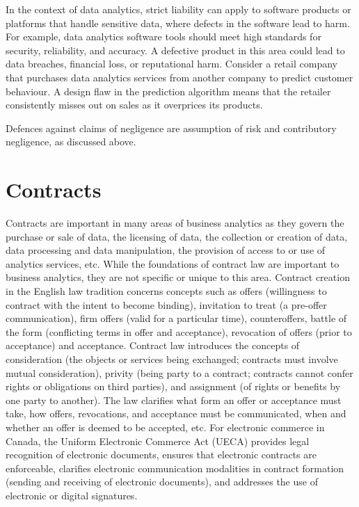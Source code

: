 In the context of data analytics, strict liability can apply to software products or platforms that handle sensitive data, where defects in the software lead to harm. For example, data analytics software tools should meet high standards for security, reliability, and accuracy. A defective product in this area could lead to data breaches, financial loss, or reputational harm. Consider a retail company that purchases data analytics services from another company to predict customer behaviour. A design flaw in the prediction algorithm means that the retailer consistently misses out on sales as it overprices its products. 

Defences against claims of negligence are assumption of risk and contributory negligence, as discussed above. 

\section{Contracts}

Contracts are important in many areas of business analytics as they govern the purchase or sale of data, the licensing of data, the collection or creation of data, data processing and data manipulation, the provision of access to or use of analytics services, etc. While the foundations of contract law are important to business analytics, they are not specific or unique to this area. Contract creation in the English law tradition concerns concepts such as offers (willingness to contract with the intent to become binding), invitation to treat (a pre-offer communication), firm offers (valid for a particular time), counteroffers, battle of the form (conflicting terms in offer and acceptance), revocation of offers (prior to acceptance) and acceptance. Contract law introduces the concepts of consideration (the objects or services being exchanged; contracts must involve mutual consideration), privity (being party to a contract; contracts cannot confer rights or obligations on third parties), and assignment (of rights or benefits by one party to another). The law clarifies what form an offer or acceptance must take, how offers, revocations, and acceptance must be communicated, when and whether an offer is deemed to be accepted, etc. For electronic commerce in Canada, the Uniform Electronic Commerce Act (UECA) provides legal recognition of electronic documents, ensures that electronic contracts are enforceable, clarifies electronic communication modalities in contract formation (sending and receiving of electronic documents), and addresses the use of electronic or digital signatures. 

